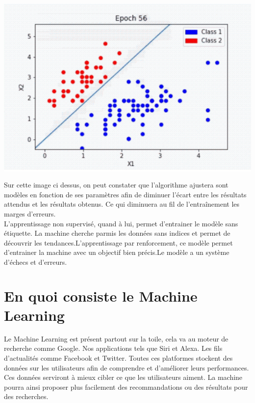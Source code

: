 \documentclass[12pt,a4paper]{report}
\begin{document}
\begin{center}
	\includegraphics[scale=0.4]{machine_learing_1}
	\label{fig1}
\end{center}


Sur cette image ci dessus, on peut constater que l'algorithme ajustera sont modèles en fonction de ses paramètres afin de diminuer l'écart entre les résultats attendus et les résultats obtenus. Ce qui diminuera au fil de l'entraînement les marges d'erreurs. \\

L'apprentissage non supervisé, quand à lui, permet d'entrainer le modèle sans étiquette. La machine cherche parmis les données sans indices et permet de découvrir les tendances.L'apprentissage par renforcement, ce modèle permet d'entrainer la machine avec un objectif bien précis.Le modèle a un système d'échecs et d'erreurs. \\






\section{En quoi consiste le Machine Learning}

Le Machine Learning est présent partout sur la toile, cela va au moteur de recherche comme Google. Nos applications tels que Siri et Alexa. Les fils d'actualités comme Facebook et Twitter. Toutes ces platformes stockent des données sur les utilisateurs afin de comprendre et d'améliorer leurs performances. Ces données serviront à mieux cibler ce que les utilisateurs aiment. La machine pourra ainsi proposer plus facilement des recommandations ou des résultats pour des recherches.
\pagebreak
\end{document}
